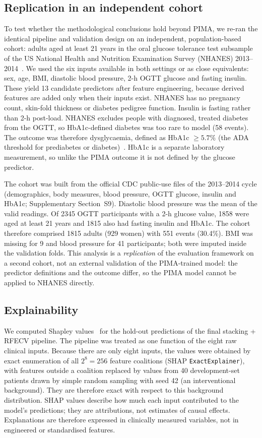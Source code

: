 \subsection{Replication in an independent cohort}
\label{sec:nhanes-methods}
To test whether the methodological conclusions hold beyond PIMA, we re-ran the identical pipeline and validation design on an independent, population-based cohort: adults aged at least 21 years in the oral glucose tolerance test subsample of the US National Health and Nutrition Examination Survey (NHANES) 2013--2014~\cite{nhanes2013}. We used the six inputs available in both settings or as close equivalents: sex, age, BMI, diastolic blood pressure, 2-h OGTT glucose and fasting insulin. These yield 13 candidate predictors after feature engineering, because derived features are added only when their inputs exist. NHANES has no pregnancy count, skin-fold thickness or diabetes pedigree function. Insulin is fasting rather than 2-h post-load. NHANES excludes people with diagnosed, treated diabetes from the OGTT, so HbA1c-defined diabetes was too rare to model (58 events). The outcome was therefore dysglycaemia, defined as HbA1c $\geq 5.7\%$ (the ADA threshold for prediabetes or diabetes)~\cite{ada2024}. HbA1c is a separate laboratory measurement, so unlike the PIMA outcome it is not defined by the glucose predictor.

The cohort was built from the official CDC public-use files of the 2013--2014 cycle (demographics, body measures, blood pressure, OGTT glucose, insulin and HbA1c; Supplementary Section~S9). Diastolic blood pressure was the mean of the valid readings. Of 2345 OGTT participants with a 2-h glucose value, 1858 were aged at least 21 years and 1815 also had fasting insulin and HbA1c. The cohort therefore comprised 1815 adults (929 women) with 551 events (30.4\%). BMI was missing for 9 and blood pressure for 41 participants; both were imputed inside the validation folds. This analysis is a \emph{replication} of the evaluation framework on a second cohort, not an external validation of the PIMA-trained model: the predictor definitions and the outcome differ, so the PIMA model cannot be applied to NHANES directly.

\subsection{Explainability}
We computed Shapley values~\cite{lundberg2017shap} for the hold-out predictions of the final stacking + RFECV pipeline. The pipeline was treated as one function of the eight raw clinical inputs. Because there are only eight inputs, the values were obtained by exact enumeration of all $2^8 = 256$ feature coalitions (SHAP \texttt{ExactExplainer}), with features outside a coalition replaced by values from 40 development-set patients drawn by simple random sampling with seed 42 (an interventional background). They are therefore exact with respect to this background distribution. SHAP values describe how much each input contributed to the model's predictions; they are attributions, not estimates of causal effects. Explanations are therefore expressed in clinically measured variables, not in engineered or standardised features.

